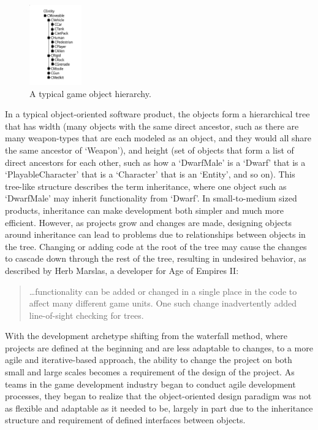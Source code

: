\begin{figure}[!h]
  \centering \includegraphics[width=0.2\textwidth]{Images/tree}
  \caption{A typical game object hierarchy. \cite{west2006evolve}}
\end{figure}

In a typical object-oriented software product, the objects form a hierarchical tree\cite{west2006evolve} that has width (many objects with the same direct ancestor, such as there are many weapon-types that are each modeled as an object, and they would all share the same ancestor of `Weapon'), and height (set of objects that form a list of direct ancestors for each other, such as how a `DwarfMale' is a `Dwarf' that is a `PlayableCharacter' that is a `Character' that is an `Entity', and so on). This tree-like structure describes the term inheritance, where one object such as `DwarfMale' may inherit functionality from `Dwarf'. In small-to-medium sized products, inheritance can make development both simpler and much more efficient. However, as projects grow and changes are made, designing objects around inheritance can lead to problems due to relationships between objects in the tree. Changing or adding code at the root of the tree may cause the changes to cascade down through the rest of the tree, resulting in undesired behavior, as described by Herb Marslas, a developer for Age of Empires II:

\begin{quote}
\ldots functionality can be added or changed in a single place in the code to affect many different game units. One such change inadvertently added line-of-sight checking for trees\cite{wilson2003game}.
\end{quote}

With the development archetype shifting from the waterfall method, where projects are defined at the beginning and are less adaptable to changes, to a more agile and iterative-based approach, the ability to change the project on both small and large scales becomes a requirement of the design of the project. As teams in the game development industry began to conduct agile development processes, they began to realize that the object-oriented design paradigm was not as flexible and adaptable as it needed to be, largely in part due to the inheritance structure and requirement of defined interfaces between objects.


